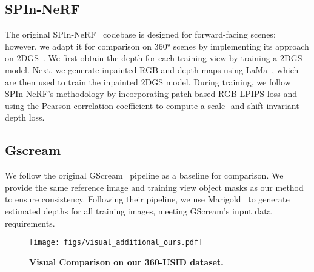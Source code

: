 \subsection{SPIn-NeRF~\cite{spinnerf}}
The original SPIn-NeRF~\cite{spinnerf} codebase is designed for forward-facing scenes; however, we adapt it for comparison on 360° scenes by implementing its approach on 2DGS~\cite{huang20242d}. We first obtain the depth for each training view by training a 2DGS model. Next, we generate inpainted RGB and depth maps using LaMa~\cite{lama}, which are then used to train the inpainted 2DGS model. During training, we follow SPIn-NeRF's methodology by incorporating patch-based RGB-LPIPS loss and using the Pearson correlation coefficient to compute a scale- and shift-invariant depth loss.






\subsection{Gscream~\cite{wang2024gscream}}
We follow the original GScream~\cite{wang2024gscream} pipeline as a baseline for comparison. We provide the same reference image and training view object masks as our method to ensure consistency. Following their pipeline, we use Marigold~\cite{ke2023repurposing} to generate estimated depths for all training images, meeting GScream's input data requirements.

\begin{figure*}[t]
    \centering
    \texttt{[image: figs/visual\_additional\_ours.pdf]}
    \caption{\textbf{Visual Comparison on our 360-USID dataset.} }
    \label{fig:visual_add_ours}
\end{figure*}

